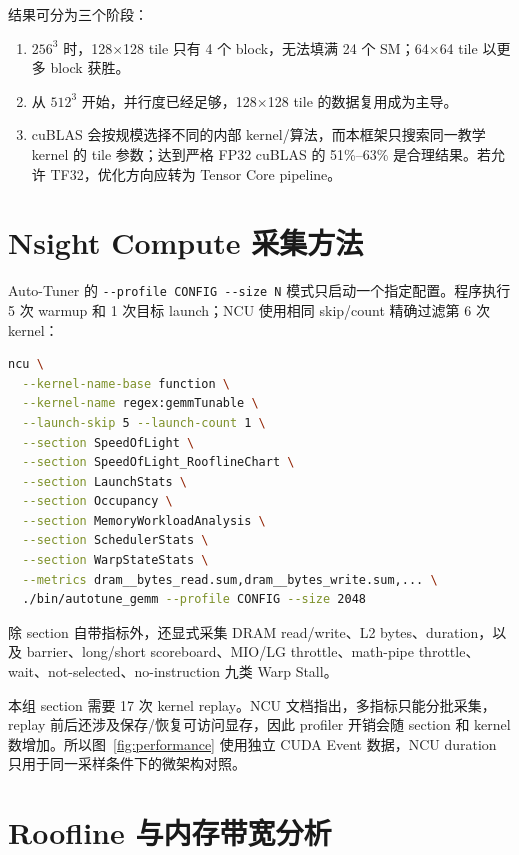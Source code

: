 \documentclass[UTF8,11pt,a4paper,fontset=fandol]{ctexart}
\newcommand{\code}[1]{\nolinkurl{#1}}
\begin{document}
结果可分为三个阶段：

\begin{enumerate}
  \item $256^3$ 时，128$\times$128 tile 只有 4 个 block，无法填满 24 个 SM；64$\times$64 tile 以更多 block 获胜。
  \item 从 $512^3$ 开始，并行度已经足够，128$\times$128 tile 的数据复用成为主导。
  \item cuBLAS 会按规模选择不同的内部 kernel/算法，而本框架只搜索同一教学 kernel 的 tile 参数；达到严格 FP32 cuBLAS 的 51\%--63\% 是合理结果。若允许 TF32，优化方向应转为 Tensor Core pipeline。
\end{enumerate}

\section{Nsight Compute 采集方法}

Auto-Tuner 的 \code{--profile CONFIG --size N} 模式只启动一个指定配置。程序执行 5 次 warmup 和 1 次目标 launch；NCU 使用相同 skip/count 精确过滤第 6 次 kernel：

\begin{lstlisting}[style=cuda,language=bash,caption={NCU 采集命令的核心参数}]
ncu \
  --kernel-name-base function \
  --kernel-name regex:gemmTunable \
  --launch-skip 5 --launch-count 1 \
  --section SpeedOfLight \
  --section SpeedOfLight_RooflineChart \
  --section LaunchStats \
  --section Occupancy \
  --section MemoryWorkloadAnalysis \
  --section SchedulerStats \
  --section WarpStateStats \
  --metrics dram__bytes_read.sum,dram__bytes_write.sum,... \
  ./bin/autotune_gemm --profile CONFIG --size 2048
\end{lstlisting}

除 section 自带指标外，还显式采集 DRAM read/write、L2 bytes、duration，以及 barrier、long/short scoreboard、MIO/LG throttle、math-pipe throttle、wait、not-selected、no-instruction 九类 Warp Stall。

本组 section 需要 17 次 kernel replay。NCU 文档指出，多指标只能分批采集，replay 前后还涉及保存/恢复可访问显存，因此 profiler 开销会随 section 和 kernel 数增加\cite{ncu-cli,ncu-overhead}。所以图~\ref{fig:performance} 使用独立 CUDA Event 数据，NCU duration 只用于同一采样条件下的微架构对照。

\section{Roofline 与内存带宽分析}
\end{document}
